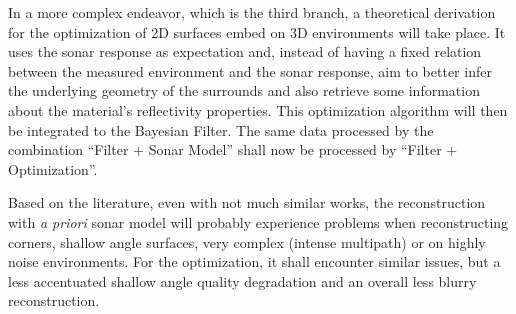In a more complex endeavor, which is the third branch, a theoretical derivation
for the optimization of 2D surfaces embed on 3D environments will take place.
It uses the sonar response as expectation and, instead of having a fixed
relation between the measured environment and the sonar response, aim to better
infer the underlying geometry of the surrounds and also retrieve some
information about the material's reflectivity properties.
This optimization algorithm will then be integrated to the Bayesian Filter. The
same data processed by the combination ``Filter + Sonar Model'' shall now be
processed by ``Filter + Optimization''.
 
Based on the literature, even with not much similar works, the reconstruction
with \textit{a priori} sonar model will probably experience problems when
reconstructing corners, shallow angle surfaces, very complex (intense multipath)
or on highly noise environments. For the optimization, it shall encounter
similar issues, but a less accentuated shallow angle quality degradation and an
overall less blurry reconstruction.